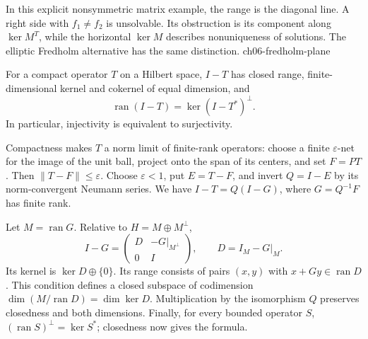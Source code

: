 {In this explicit nonsymmetric matrix example, the range is the diagonal line. A right side with $f_1\ne f_2$ is unsolvable. Its obstruction is its component along $\ker M^T$, while the horizontal $\ker M$ describes nonuniqueness of solutions. The elliptic Fredholm alternative has the same distinction.}
{ch06-fredholm-plane}

\begin{lemma}\label{lem:6-fredholm}
For a compact operator $T$ on a Hilbert space, $I-T$ has closed range,
finite-dimensional kernel and cokernel of equal dimension, and
\[
 \operatorname{ran}(I-T)=\ker(I-T^*)^\perp.
\]
In particular, injectivity is equivalent to surjectivity.
\end{lemma}
\Needspace{45mm}
\begin{expandedproof}
Compactness makes $T$ a norm limit of finite-rank operators: choose a
finite $\varepsilon$-net for the image of the unit ball, project onto
the span of its centers, and set $F=PT$. Then
$\|T-F\|\leq\varepsilon$. Choose $\varepsilon<1$, put $E=T-F$, and
invert $Q=I-E$ by its norm-convergent Neumann series.
We have $I-T=Q(I-G)$, where $G=Q^{-1}F$ has finite rank.

Let $M=\operatorname{ran}G$. Relative to $H=M\oplus M^\perp$,
\[
 I-G=\begin{pmatrix}D&-G|_{M^\perp}\\0&I\end{pmatrix},
 \qquad D=I_M-G|_M.
\]
Its kernel is $\ker D\oplus\{0\}$. Its range consists of pairs $(x,y)$
with $x+Gy\in\operatorname{ran}D$. This condition defines a closed
subspace of codimension $\dim(M/\operatorname{ran}D)=\dim\ker D$.
Multiplication by the isomorphism $Q$ preserves closedness and both
dimensions. Finally, for every bounded operator $S$,
$(\operatorname{ran}S)^\perp=\ker S^*$; closedness now gives the formula.
\end{expandedproof}

